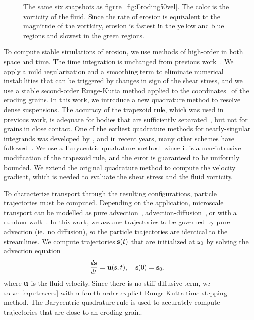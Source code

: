 \documentclass{jfm}
\begin{document}
\begin{figure}
\begin{center}
\caption{\label{fig:Eroding50vort} The same six snapshots as
figure~\ref{fig:Eroding50vel}.  The color is the vorticity of the fluid.
Since the rate of erosion is equivalent to the magnitude of the
vorticity, erosion is fastest in the yellow and blue regions and slowest
in the green regions.}
\end{center}
\end{figure}

To compute stable simulations of erosion, we use methods of high-order
in both space and time. The time integration is unchanged from previous
work~\citep{qua-moo2018}.  We apply a mild regularization and a
smoothing term to eliminate numerical instabilities that can be
triggered by changes in sign of the shear stress, and we use a stable
second-order Runge-Kutta method applied to the {\thL}
coordinates~\citep{hou-low-she1994} of the eroding grains.  In this
work, we introduce a new quadrature method to resolve dense suspensions.
The accuracy of the trapezoid rule, which was used in previous work, is
adequate for bodies that are sufficiently separated~\citep{tre-wei2014},
but not for grains in close contact.  One of the earliest quadrature
methods for nearly-singular integrands was developed
by~\citet{bak-she1986}, and in recent years, many other schemes have
followed~\citep{oja-tor2015, kli-tor2018, hel-oja2008a, bea-yin-wil2016,
bea-lai2001, klo-bar-gre-one2013}.  We use a Barycentric quadrature
method~\citep{bar2014, bar-wu-vee2015} since it is a non-intrusive
modification of the trapezoid rule, and the error is guaranteed to be
uniformly bounded.  We extend the original quadrature method to compute
the velocity gradient, which is needed to evaluate the shear stress and
the fluid vorticity.

To characterize transport through the resulting configurations, particle
trajectories must be computed. Depending on the application, microscale
transport can be modelled as pure advection~\citep{dea-qua-bir-jua2018,
leb-ded-dav-bou2007, cve-che-wen1996, puy-gou-den2019},
advection-diffusion~\citep{cus-hu-den1995, dag1987, den-ica-hid2018}, or
with a random walk~\citep{saf1959, bij-blu2006, ber-sch-sil2000}.  In
this work, we assume trajectories to be governed by pure advection
(ie.~no diffusion), so the particle trajectories are identical to the
streamlines. We compute trajectories $\ss(t)$ that are initialized at
$\ss_0$ by solving the advection equation
\begin{align}
  \frac{d\ss}{dt} = \uu(\ss,t), \quad \ss(0) = \ss_0,
  \label{eqn:tracers}
\end{align}
where $\uu$ is the fluid velocity.  Since there is no stiff diffusive
term, we solve~\eqref{eqn:tracers} with a fourth-order explicit
Runge-Kutta time stepping method. The Barycentric quadrature rule is
used to accurately compute trajectories that are close to an eroding
grain. 
\end{document}
